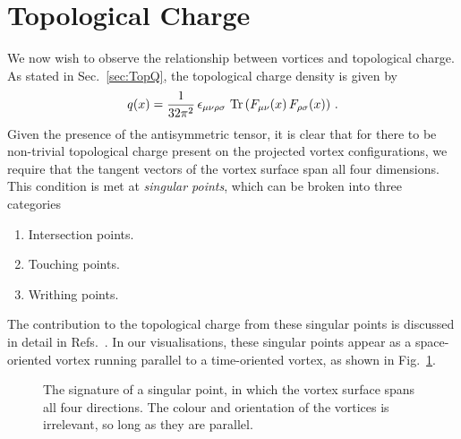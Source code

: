\section{Topological Charge}\label{sec:TopChargeVis}
We now wish to observe the relationship between vortices and topological charge. As stated in Sec.~\ref{sec:TopQ}, the topological charge density is given by
%
\begin{equation}
q ( x ) = \frac { 1 } { 32 \pi ^ { 2 } } \, \epsilon _ { \mu \nu \rho \sigma } \, \operatorname{Tr}\left( F _ { \mu \nu }( x ) \, F _ { \rho \sigma }(x) \right) \, .
\end{equation}
%
Given the presence of the antisymmetric tensor, it is clear that for there to be non-trivial topological charge present on the projected vortex configurations, we require that the tangent vectors of the vortex surface span all four dimensions. This condition is met at \textit{singular points}, which can be broken into three categories~\cite{Engelhardt:2010ft,Engelhardt:2000wc}
\begin{enumerate}
\item Intersection points.
\item Touching points.
\item Writhing points.
\end{enumerate}
The contribution to the topological charge from these singular points is discussed in detail in Refs.~\cite{Bruckmann:2003yd,Engelhardt:2010ft,Engelhardt:2000wc,Engelhardt:1999xw}. In our visualisations, these singular points appear as a space-oriented vortex running parallel to a time-oriented vortex, as shown in Fig.~\ref{fig:SingularPoint}.\\
%
\begin{figure}[htb!]
\centering

\caption{\label{fig:SingularPoint} The signature of a singular point, in which the vortex surface spans all four directions. The colour and orientation of the vortices is irrelevant, so long as they are parallel.}
\end{figure}
%

